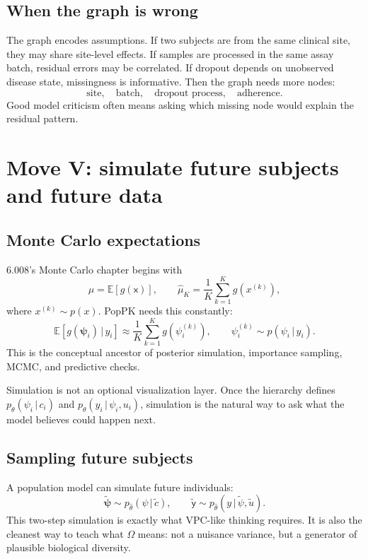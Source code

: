 \documentclass[a4paper]{article}
\newcommand{\rv}[1]{\mathsf{#1}}
\newcommand{\rpsi}{\boldsymbol{\psi}}
\newcommand{\given}{\,|\,}
\newcommand{\E}{\mathbb{E}}
\begin{document}
\subsection{When the graph is wrong}

The graph encodes assumptions. If two subjects are from the same clinical site, they may share site-level effects. If samples are processed in the same assay batch, residual errors may be correlated. If dropout depends on unobserved disease state, missingness is informative. Then the graph needs more nodes:
\[
  \text{site},\quad \text{batch},\quad \text{dropout process},\quad \text{adherence}.
\]
Good model criticism often means asking which missing node would explain the residual pattern.

\section{Move V: simulate future subjects and future data}

\subsection{Monte Carlo expectations}

6.008's Monte Carlo chapter begins with
\[
  \mu = \E[g(\rv{x})],
  \qquad
  \widehat\mu_K=\frac{1}{K}\sum_{k=1}^K g(x^{(k)}),
\]
where \(x^{(k)}\sim p(x)\). PopPK needs this constantly:
\[
  \E[g(\rpsi_i)\given y_i]
  \approx
  \frac{1}{K}\sum_{k=1}^K g(\psi_i^{(k)}),
  \qquad
  \psi_i^{(k)}\sim p(\psi_i\given y_i).
\]
This is the conceptual ancestor of posterior simulation, importance sampling, MCMC, and predictive checks.

Simulation is not an optional visualization layer.  Once the hierarchy defines \(p_\theta(\psi_i\given c_i)\) and \(p_\theta(y_i\given\psi_i,u_i)\), simulation is the natural way to ask what the model believes could happen next.

\subsection{Sampling future subjects}

A population model can simulate future individuals:
\[
  \tilde{\rpsi} \sim p_{\widehat\theta}(\psi\given \tilde c),
  \qquad
  \tilde{\rv{y}}\sim p_{\widehat\theta}(y\given \tilde\psi,\tilde u).
\]
This two-step simulation is exactly what VPC-like thinking requires. It is also the cleanest way to teach what \(\Omega\) means: not a nuisance variance, but a generator of plausible biological diversity.
\end{document}
